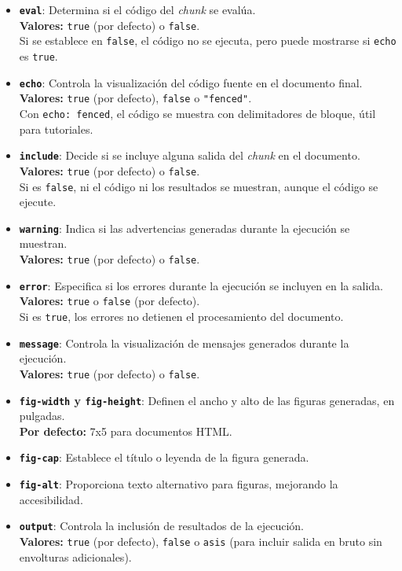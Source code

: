 \documentclass[
  10pt,
]{article}
\begin{document}
\begin{itemize}
\item
  \textbf{\texttt{eval}}: Determina si el código del \emph{chunk} se
  evalúa.\\
  \textbf{Valores:} \texttt{true} (por defecto) o \texttt{false}.\\
  Si se establece en \texttt{false}, el código no se ejecuta, pero puede
  mostrarse si \texttt{echo} es \texttt{true}.
\item
  \textbf{\texttt{echo}}: Controla la visualización del código fuente en
  el documento final.\\
  \textbf{Valores:} \texttt{true} (por defecto), \texttt{false} o
  \texttt{"fenced"}.\\
  Con \texttt{echo:\ fenced}, el código se muestra con delimitadores de
  bloque, útil para tutoriales.
\item
  \textbf{\texttt{include}}: Decide si se incluye alguna salida del
  \emph{chunk} en el documento.\\
  \textbf{Valores:} \texttt{true} (por defecto) o \texttt{false}.\\
  Si es \texttt{false}, ni el código ni los resultados se muestran,
  aunque el código se ejecute.
\item
  \textbf{\texttt{warning}}: Indica si las advertencias generadas
  durante la ejecución se muestran.\\
  \textbf{Valores:} \texttt{true} (por defecto) o \texttt{false}.
\item
  \textbf{\texttt{error}}: Especifica si los errores durante la
  ejecución se incluyen en la salida.\\
  \textbf{Valores:} \texttt{true} o \texttt{false} (por defecto).\\
  Si es \texttt{true}, los errores no detienen el procesamiento del
  documento.
\item
  \textbf{\texttt{message}}: Controla la visualización de mensajes
  generados durante la ejecución.\\
  \textbf{Valores:} \texttt{true} (por defecto) o \texttt{false}.
\item
  \textbf{\texttt{fig-width} y \texttt{fig-height}}: Definen el ancho y
  alto de las figuras generadas, en pulgadas.\\
  \textbf{Por defecto:} 7x5 para documentos HTML.
\item
  \textbf{\texttt{fig-cap}}: Establece el título o leyenda de la figura
  generada.
\item
  \textbf{\texttt{fig-alt}}: Proporciona texto alternativo para figuras,
  mejorando la accesibilidad.
\item
  \textbf{\texttt{output}}: Controla la inclusión de resultados de la
  ejecución.\\
  \textbf{Valores:} \texttt{true} (por defecto), \texttt{false} o
  \texttt{asis} (para incluir salida en bruto sin envolturas
  adicionales).
\end{itemize}
\end{document}
